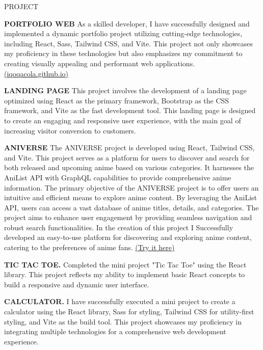 \documentclass{resume} %
\begin{document}
\begin{rSection}{PROJECT}
\vspace{-1.25em}

\item \textbf{PORTFOLIO WEB} {As a skilled developer, I have successfully designed and implemented a dynamic portfolio project utilizing cutting-edge technologies, including React, Sass, Tailwind CSS, and Vite. This project not only showcases my proficiency in these technologies but also emphasizes my commitment to creating visually appealing and performant web applications.  \href{https://iqoqacola.github.io/anime-list/}{(iqoqacola.github.io)}}

\item \textbf{LANDING PAGE} {This project involves the development of a landing page optimized using React as the primary framework, Bootstrap as the CSS framework, and Vite as the fast development tool. This landing page is designed to create an engaging and responsive user experience, with the main goal of increasing visitor conversion to customers.}

\item \textbf{ANIVERSE} {The ANIVERSE project is developed using React, Tailwind CSS, and Vite. This project serves as a platform for users to discover and search for both released and upcoming anime based on various categories. It harnesses the AniList API with GraphQL capabilities to provide comprehensive anime information. The primary objective of the ANIVERSE project is to offer users an intuitive and efficient means to explore anime content. By leveraging the AniList API, users can access a vast database of anime titles, details, and categories. The project aims to enhance user engagement by providing seamless navigation and robust search functionalities. In the creation of this project I Successfully developed an easy-to-use platform for discovering and exploring anime content, catering to the preferences of anime fans. \href{https://iqoqacola.github.io/anime-list/}{(Try it here)}}

\item \textbf{TIC TAC TOE.} {Completed the mini project "Tic Tac Toe" using the React library. This project reflects my ability to implement basic React concepts to build a responsive and dynamic user interface.}

\item \textbf{CALCULATOR.} {I have successfully executed a mini project to create a calculator using the React library, Sass for styling, Tailwind CSS for utility-first styling, and Vite as the build tool. This project showcases my proficiency in integrating multiple technologies for a comprehensive web development experience.}

\end{rSection} 
\end{document}
